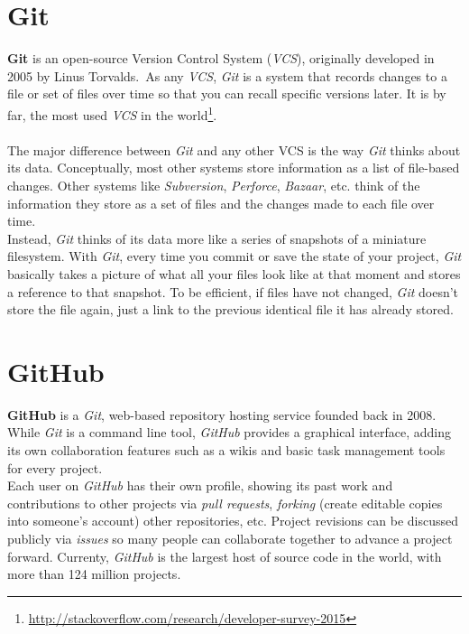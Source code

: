 \documentclass[a4paper, 12pt]{book}
\begin{document}
\section{Git}
\label{sec:git}
\textbf{Git} is an open-source Version Control System (\emph{VCS}), originally developed in 2005 by Linus Torvalds.\
As any \emph{VCS}, \emph{Git} is a system that records changes to a file or set of files over time
so that you can recall specific versions later.
It is by far, the most used \emph{VCS} in the world\footnote{\url{http://stackoverflow.com/research/developer-survey-2015}}.\\\\
The major difference between \emph{Git} and any other VCS is the way \emph{Git} thinks about its data.
Conceptually, most other systems store information as a list of file-based changes. Other systems like \textit{Subversion},
\textit{Perforce}, \textit{Bazaar}, etc. think of the information they store as a set of files and the changes made to each
file over time.\\
Instead, \emph{Git} thinks of its data more like a series of snapshots of a miniature filesystem.
With \emph{Git}, every time you commit or save the state of your project, \emph{Git} basically takes a picture of what all
your files look like at that moment and stores a reference to that snapshot. To be efficient, if files have not changed,
\emph{Git} doesn't store the file again, just a link to the previous identical file it has already stored.
\section{GitHub}
\label{sec:github}
\textbf{GitHub} is a \emph{Git}, web-based repository hosting service founded back in 2008. While \emph{Git} is a command
line tool, \emph{GitHub} provides a graphical interface, adding its own collaboration features such as a wikis and basic task
management tools for every project.\\
Each user on \emph{GitHub} has their own profile, showing its past work and contributions to
other projects via \textit{pull requests}, \textit{forking} (create editable copies into someone's account) other repositories, etc.
Project revisions can be discussed publicly via \textit{issues} so many people can collaborate together to advance a project
forward. Currenty, \emph{GitHub} is the largest host of source code in the world,
with more than 124 million projects.
\end{document}
